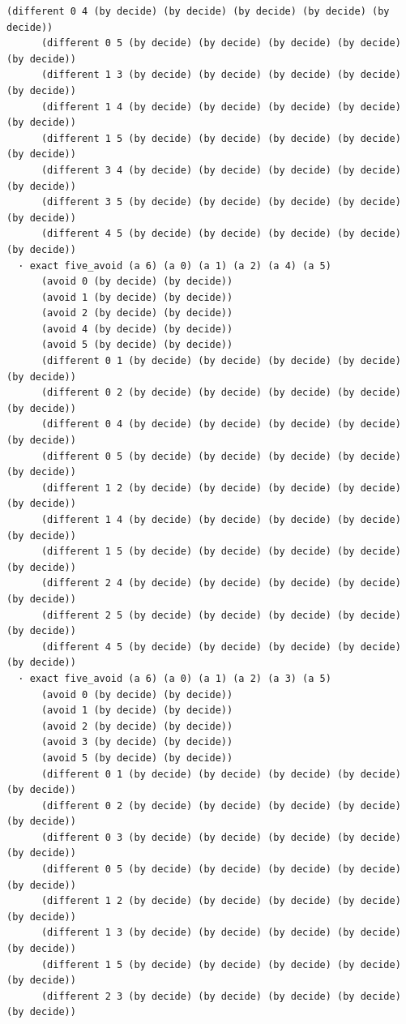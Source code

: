 \documentclass[11pt,a4paper]{article}
\begin{document}
\begin{Verbatim}[breaklines,breakanywhere,fontsize=\footnotesize]
      (different 0 4 (by decide) (by decide) (by decide) (by decide) (by decide))
      (different 0 5 (by decide) (by decide) (by decide) (by decide) (by decide))
      (different 1 3 (by decide) (by decide) (by decide) (by decide) (by decide))
      (different 1 4 (by decide) (by decide) (by decide) (by decide) (by decide))
      (different 1 5 (by decide) (by decide) (by decide) (by decide) (by decide))
      (different 3 4 (by decide) (by decide) (by decide) (by decide) (by decide))
      (different 3 5 (by decide) (by decide) (by decide) (by decide) (by decide))
      (different 4 5 (by decide) (by decide) (by decide) (by decide) (by decide))
  · exact five_avoid (a 6) (a 0) (a 1) (a 2) (a 4) (a 5)
      (avoid 0 (by decide) (by decide))
      (avoid 1 (by decide) (by decide))
      (avoid 2 (by decide) (by decide))
      (avoid 4 (by decide) (by decide))
      (avoid 5 (by decide) (by decide))
      (different 0 1 (by decide) (by decide) (by decide) (by decide) (by decide))
      (different 0 2 (by decide) (by decide) (by decide) (by decide) (by decide))
      (different 0 4 (by decide) (by decide) (by decide) (by decide) (by decide))
      (different 0 5 (by decide) (by decide) (by decide) (by decide) (by decide))
      (different 1 2 (by decide) (by decide) (by decide) (by decide) (by decide))
      (different 1 4 (by decide) (by decide) (by decide) (by decide) (by decide))
      (different 1 5 (by decide) (by decide) (by decide) (by decide) (by decide))
      (different 2 4 (by decide) (by decide) (by decide) (by decide) (by decide))
      (different 2 5 (by decide) (by decide) (by decide) (by decide) (by decide))
      (different 4 5 (by decide) (by decide) (by decide) (by decide) (by decide))
  · exact five_avoid (a 6) (a 0) (a 1) (a 2) (a 3) (a 5)
      (avoid 0 (by decide) (by decide))
      (avoid 1 (by decide) (by decide))
      (avoid 2 (by decide) (by decide))
      (avoid 3 (by decide) (by decide))
      (avoid 5 (by decide) (by decide))
      (different 0 1 (by decide) (by decide) (by decide) (by decide) (by decide))
      (different 0 2 (by decide) (by decide) (by decide) (by decide) (by decide))
      (different 0 3 (by decide) (by decide) (by decide) (by decide) (by decide))
      (different 0 5 (by decide) (by decide) (by decide) (by decide) (by decide))
      (different 1 2 (by decide) (by decide) (by decide) (by decide) (by decide))
      (different 1 3 (by decide) (by decide) (by decide) (by decide) (by decide))
      (different 1 5 (by decide) (by decide) (by decide) (by decide) (by decide))
      (different 2 3 (by decide) (by decide) (by decide) (by decide) (by decide))

\end{Verbatim}
\end{document}
